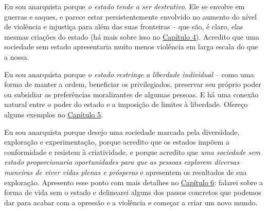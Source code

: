 Eu sou anarquista porque \emph{o estado tende a ser destrutivo}. Ele se envolve em guerras e saques, e parece estar persistentemente envolvido no aumento do nível de violência e injustiça para além das suas fronteiras -- que são, é claro, elas mesmas criações do estado (há mais sobre isso no \hyperref[chap:4]{Capítulo 4}). Acredito que uma sociedade sem estado apresentaria muito menos violência em larga escala do que a nossa.

Eu sou anarquista porque \emph{o estado restringe a liberdade individual} -- como uma forma de manter a ordem, beneficiar os privilegiados, preservar seu próprio poder ou subsidiar as preferências moralizantes de algumas pessoas. E há uma conexão natural entre o poder do estado e a imposição de limites à liberdade. Ofereço alguns exemplos no \hyperref[chap:5]{Capítulo 5}.

Eu sou anarquista porque desejo uma sociedade marcada pela diversidade, exploração e experimentação, porque acredito que os estados impõem a conformidade e resistem à criatividade, e porque acredito que \emph{uma sociedade sem estado proporcionaria oportunidades para que as pessoas explorem diversas maneiras de viver vidas plenas e prósperas} e apresentem os resultados de sua exploração. Apresento esse ponto com mais detalhes no \hyperref[chap:6]{Capítulo 6}: falarei sobre a forma de vida sem o estado e delinearei alguns dos passos concretos que podemos dar para acabar com a opressão e a violência e começar a criar um novo mundo.